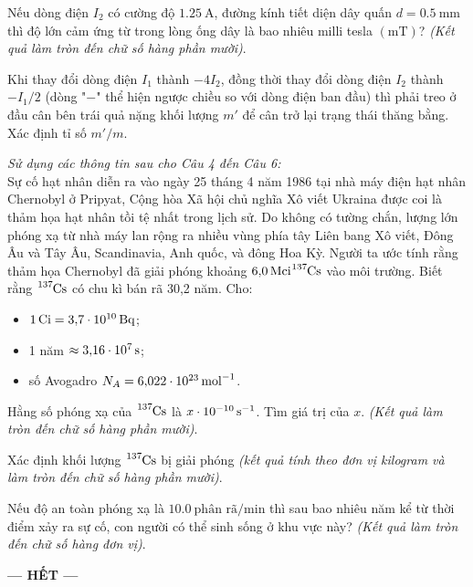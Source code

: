 \begin{ex}
	Nếu dòng điện $I_2$ có cường độ $\SI{1.25}{\ampere}$, đường kính tiết diện dây quấn $d=\SI{0.5}{\milli\meter}$ thì độ lớn cảm ứng từ trong lòng ống dây là bao nhiêu milli tesla $\left(\si{\milli\tesla}\right)$? \textit{(Kết quả làm tròn đến chữ số hàng phần mười)}.
	\loigiai{
		
	}
\end{ex}
\begin{ex}
	Khi thay đổi dòng điện $I_1$ thành $-4I_2$, đồng thời thay đổi dòng điện $I_2$ thành $-I_1/2$ (dòng "$-$" thể hiện ngược chiều so với dòng điện ban đầu) thì phải treo ở đầu cân bên trái quả nặng khối lượng $m'$ để cân trở lại trạng thái thăng bằng. Xác định tỉ số $m'/m$.
	\loigiai{
		
	}
\end{ex}
\textit{Sử dụng các thông tin sau cho Câu 4 đến Câu 6:}\\
Sự cố hạt nhân diễn ra vào ngày 25 tháng 4 năm 1986 tại nhà máy điện hạt nhân Chernobyl ở Pripyat, Cộng hòa Xã hội chủ nghĩa Xô viết Ukraina được coi là thảm họa hạt nhân tồi tệ nhất trong lịch sử. Do không có tường chắn, lượng lớn phóng xạ từ nhà máy lan rộng ra nhiều vùng phía tây Liên bang Xô viết, Đông Âu và Tây Âu, Scandinavia, Anh quốc, và đông Hoa Kỳ. Người ta ước tính rằng thảm họa Chernobyl đã giải phóng khoảng $\SI{6.0}{\mega ci} \ce{^{137}Cs}$ vào môi trường. Biết rằng $\ce{^{137}Cs}$ có chu kì bán rã 30,2 năm. Cho:	
\begin{itemize}
	\item $\SI{1}{Ci}=\SI{3.7E10}{\becquerel}$;
	\item 1 năm $\approx\SI{3.16E7}{\second}$;
	\item số Avogadro $N_A=\SI{6.022E23}{\mole^{-1}}$.
\end{itemize}
\begin{ex}
Hằng số phóng xạ của $\ce{^{137}Cs}$ là $\xsi{x\cdot10^{-10}}{\second^{-1}}$. Tìm giá trị của $x$. \textit{(Kết quả làm tròn đến chữ số hàng phần mười)}.
	\loigiai{
		
	}
\end{ex}
\begin{ex}
	Xác định khối lượng $\ce{^{137}Cs}$ bị giải phóng \textit{(kết quả tính theo đơn vị kilogram và làm tròn đến chữ số hàng phần mười)}.
	\loigiai{
		
	}
\end{ex}
\begin{ex}
	Nếu độ an toàn phóng xạ là $\SI{10.0}{\text{phân rã}/\minute}$ thì sau bao nhiêu năm kể từ thời điểm xảy ra sự cố, con người có thể sinh sống ở khu vực này? \textit{(Kết quả làm tròn đến chữ số hàng đơn vị)}.
	\loigiai{
		
	}
\end{ex}
\begin{center}
	\textbf{--- HẾT ---}
\end{center}
